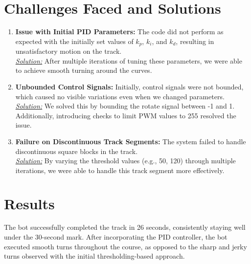 \documentclass{article}
\begin{document}
\section{Challenges Faced and Solutions}
\begin{enumerate}[left=0pt, label=\textbf{Problem \arabic*}:, itemsep=10pt]
  \item \textbf{Issue with Initial PID Parameters:} The code did not perform as expected with the initially set values of $k_p$, $k_i$, and $k_d$, resulting in unsatisfactory motion on the track.\\
  \underline{\textit{Solution:}} After multiple iterations of tuning these parameters, we were able to achieve smooth turning around the curves.

  \item \textbf{Unbounded Control Signals:} Initially, control signals were not bounded, which caused no visible variations even when we changed parameters.\\
  \underline{\textit{Solution:}} We solved this by bounding the rotate signal between -1 and 1. Additionally, introducing checks to limit PWM values to 255 resolved the issue.

  \item \textbf{Failure on Discontinuous Track Segments:} The system failed to handle discontinuous square blocks in the track.\\
  \underline{\textit{Solution:}} By varying the threshold values (e.g., 50, 120) through multiple iterations, we were able to handle this track segment more effectively.

\end{enumerate}

\section{Results}

The bot successfully completed the track in 26 seconds, consistently staying well under the 30-second mark. After incorporating the PID controller, the bot executed smooth turns throughout the course, as opposed to the sharp and jerky turns observed with the initial thresholding-based approach.
\end{document}
